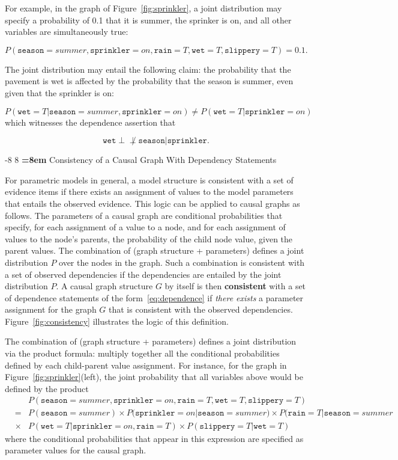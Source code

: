 \documentclass{elsarticle}%
\makeatletter
\renewcommand\subsection{\@startsection {subsection}{1}{\z@}%
  {-8\p@ \@plus -4\p@ \@minus -4\p@}%
                       {8\p@ \@plus 4\p@ \@minus 4\p@}%
                                   {\normalfont\large\bfseries\boldmath
                                   \rightskip=\z@ \@plus 8em\pretolerance=10000 }}
\newcommand{\true}{\mathit{T}}
\newcommand{\dep}{\ensuremath{{\perp{}\!\!\!\!\!\!\!\not  \perp{}}}}
\newcommand{\G}{G}
\newcommand{\rain}{\mathtt{rain}}
\newcommand{\wet}{\mathtt{wet}}
\newcommand{\sprinkler}{\mathtt{sprinkler}}
\newcommand{\slippery}{\mathtt{slippery}}
\newcommand{\season}{\mathtt{season}}
\newcommand{\summer}{\mathit{summer}}
\newcommand{\on}{\mathit{on}}
\makeatother
\begin{document}
For example, in the graph of Figure~\ref{fig:sprinkler}, a joint distribution may specify a probability of 0.1 that it is summer, the sprinker is on, and all other variables
are simultaneously true:

$$
P(\season = \summer, \sprinkler = \on, \rain = \true, \wet = \true, \slippery = \true) = 0.1.
$$

The joint distribution may entail the following claim: the probability that the
pavement is wet is affected by the probability that the season is summer, even
given that the sprinkler is on:

$$
P(\wet = \true|\season = \summer, \sprinkler = \on) \neq P(\wet = \true|\sprinkler = \on) 
$$
which witnesses the dependence assertion that

$$\wet \dep \season|\sprinkler.$$





\subsection{Consistency of a Causal Graph With Dependency Statements} \label{sec:bn-consistency}


For parametric models in general, a model structure is consistent with a set of evidence items if there exists an assignment of values to the model parameters that entails the observed evidence. This logic can be applied to causal graphs as follows. The parameters of a causal graph are conditional probabilities that specify, for each assignment of a value to a node, and for each assignment of values to the node's parents, the probability of the child node value, given the parent values.  The combination of (graph structure + parameters) defines a joint distribution $P$ over the nodes in the graph. Such a combination is consistent with a set of observed dependencies if the dependencies are entailed by the joint distribution $P$. A causal graph structure $\G$ by itself is then \textbf{consistent} with a set of dependence statements of the form~\ref{eq:dependence} if {\em there exists} a parameter assignment for the graph $\G$ that is consistent with the observed dependencies. Figure~\ref{fig:consistency} illustrates the logic of this definition. 


The combination of (graph structure + parameters) defines a joint distribution via the product formula: multiply together all the conditional probabilities defined by each child-parent value assignment. For instance, for the graph in Figure~\ref{fig:sprinkler}(left), the joint probability that all variables above would be defined by the product
\begin{eqnarray*}
&&P(\season = \summer, \sprinkler = \on, \rain = \true, \wet = \true, \slippery = \true)   \\
&=&P(\season = \summer) \times P(\sprinkler=\on|\season = \summer) \times P(\rain = \true|\season =  summer \\
& \times& P(\wet = \true|\sprinkler = \on, \rain = \true) \times   P(\slippery = \true|\wet = \true)
\end{eqnarray*}
where the conditional probabilities that appear in this expression are specified as parameter values for the causal graph. 
\end{document}
